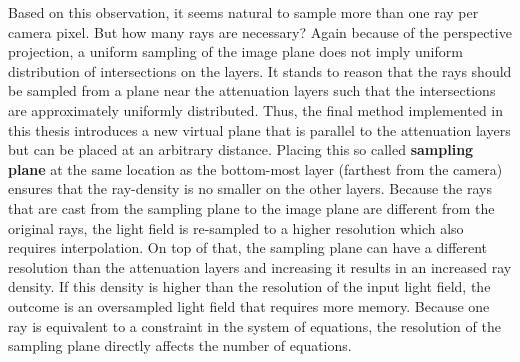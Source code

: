 Based on this observation, it seems natural to sample more than one ray per camera pixel.
But how many rays are necessary? 
Again because of the perspective projection, a uniform sampling of the image plane does not imply uniform distribution of intersections on the layers.
It stands to reason that the rays should be sampled from a plane near the attenuation layers such that the intersections are approximately uniformly distributed.
Thus, the final method implemented in this thesis introduces a new virtual plane that is parallel to the attenuation layers but can be placed at an arbitrary distance.
Placing this so called \textbf{sampling plane} at the same location as the bottom-most layer (farthest from the camera) ensures that the ray-density is no smaller on the other layers.
Because the rays that are cast from the sampling plane to the image plane are different from the original rays, the light field is re-sampled to a higher resolution which also requires interpolation.
On top of that, the sampling plane can have a different resolution than the attenuation layers and increasing it results in an increased ray density.
If this density is higher than the resolution of the input light field, the outcome is an oversampled light field that requires more memory.
Because one ray is equivalent to a constraint in the system of equations, the resolution of the sampling plane directly affects the number of equations.
